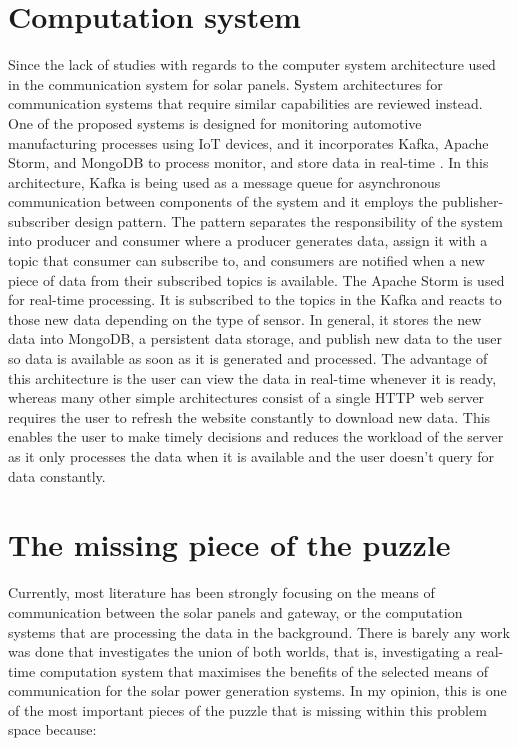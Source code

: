 \documentclass[../thesis.tex]{subfiles}
\begin{document}
\section{Computation system}

Since the lack of studies with regards to the computer system architecture used in the communication system for solar panels. System architectures for communication systems that require similar capabilities are reviewed instead. One of the proposed systems is designed for monitoring automotive manufacturing processes using IoT devices, and it incorporates Kafka, Apache Storm, and MongoDB to process monitor, and store data in real-time \cite{Syafrudin_2018}. In this architecture, Kafka is being used as a message queue for asynchronous communication between components of the system and it employs the publisher-subscriber design pattern. The pattern separates the responsibility of the system into producer and consumer where a producer generates data, assign it with a topic that consumer can subscribe to, and consumers are notified when a new piece of data from their subscribed topics is available. The Apache Storm is used for real-time processing. It is subscribed to the topics in the Kafka and reacts to those new data depending on the type of sensor. In general, it stores the new data into MongoDB, a persistent data storage, and publish new data to the user so data is available as soon as it is generated and processed. The advantage of this architecture is the user can view the data in real-time whenever it is ready, whereas many other simple architectures consist of a single HTTP web server requires the user to refresh the website constantly to download new data. This enables the user to make timely decisions and reduces the workload of the server as it only processes the data when it is available and the user doesn't query for data constantly.


\section{The missing piece of the puzzle}

Currently, most literature has been strongly focusing on the means of communication between the solar panels and gateway, or the computation systems that are processing the data in the background. There is barely any work was done that investigates the union of both worlds, that is, investigating a real-time computation system that maximises the benefits of the selected means of communication for the solar power generation systems. In my opinion, this is one of the most important pieces of the puzzle that is missing within this problem space because:
\end{document}
